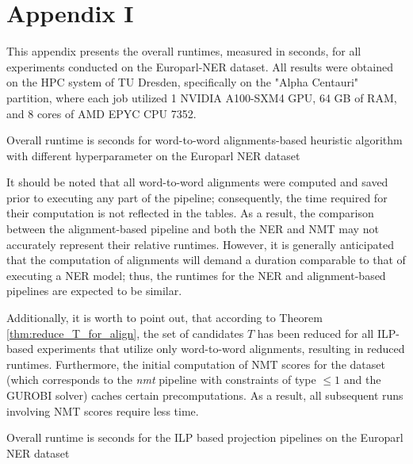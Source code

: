 \chapter{Appendix I}
\label{sec:appendix}

This appendix presents the overall runtimes, measured in seconds, for all
experiments conducted on the Europarl-NER dataset.
All results were obtained on the HPC system of TU Dresden, specifically
on the "Alpha Centauri" partition, where each job
utilized 1 NVIDIA A100-SXM4 GPU, 64 GB of RAM, and 8 cores of AMD EPYC CPU 7352.

\begin{table}[ht]
  \centering
  
  \caption{Overall runtime is seconds for word-to-word alignments-based heuristic
  algorithm with different hyperparameter  on the Europarl NER dataset}
  \label{tab:europarl_heur_runtime}
\end{table}

It should be noted that all word-to-word alignments were computed
and saved prior to executing any part of the pipeline; consequently,
the time required for their computation is not reflected in the
tables. As a result, the comparison between the alignment-based pipeline
and both the NER and NMT may not accurately represent their
relative runtimes. However, it is generally anticipated that
the computation of alignments will demand a duration comparable
to that of executing a NER model; thus, the runtimes for the
NER and alignment-based pipelines are expected to be similar.

Additionally, it is worth to point out, that according to Theorem \ref{thm:reduce_T_for_align},
the set of candidates \( T \) has been reduced for all ILP-based experiments that
utilize only word-to-word alignments, resulting in reduced runtimes. Furthermore, the initial
computation of NMT scores for the dataset (which corresponds to the \textit{nmt}
pipeline with constraints of type \( \leq 1 \) and the GUROBI solver) caches certain
precomputations. As a result, all subsequent runs involving NMT scores require
less time.

\begin{table}[t]
  \centering
  
  \caption{Overall runtime is seconds for the ILP based projection pipelines
  on the Europarl NER dataset}
  \label{tab:europarl_ilp_runtime}
\end{table}
